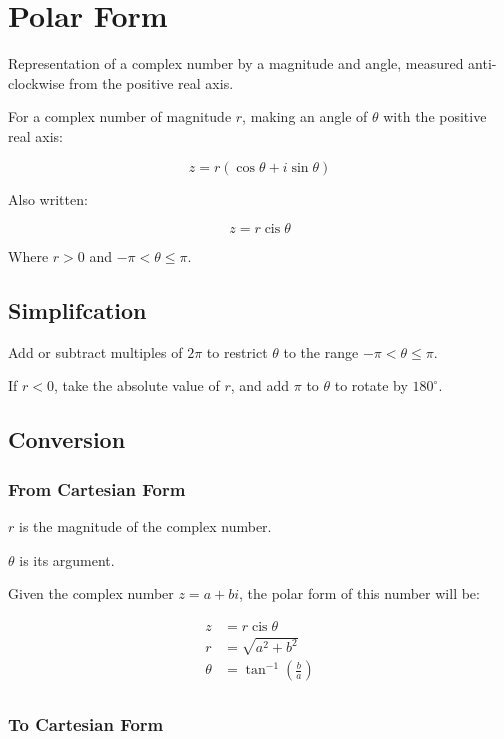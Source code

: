 \documentclass[a4paper,11pt]{article}
\DeclareMathOperator\cis{cis}
\begin{document}
\section{Polar Form}

Representation of a complex number by a magnitude and angle, measured
anti-clockwise from the positive real axis.

For a complex number of magnitude $r$, making an angle of $\theta$ with the
positive real axis:

$$
z = r (\cos{\theta} + i\sin{\theta})
$$

Also written:

$$
z = r \cis{\theta}
$$

Where $r > 0$ and $-\pi < \theta \leq \pi$.


\subsection{Simplifcation}

Add or subtract multiples of $2\pi$ to restrict $\theta$ to the range
$-\pi < \theta \leq \pi$.

If $r < 0$, take the absolute value of $r$, and add $\pi$ to $\theta$ to rotate
by $180^\circ$.


\subsection{Conversion}

\subsubsection{From Cartesian Form}

$r$ is the magnitude of the complex number.

$\theta$ is its argument.

Given the complex number $z = a + bi$, the polar form of this number will be:

$$
\begin{aligned}
z & = r \cis{\theta} \\
r & = \sqrt{a^2 + b^2} \\
\theta & = \tan^{-1}(\frac{b}{a}) \\
\end{aligned}
$$


\subsubsection{To Cartesian Form}
\end{document}

